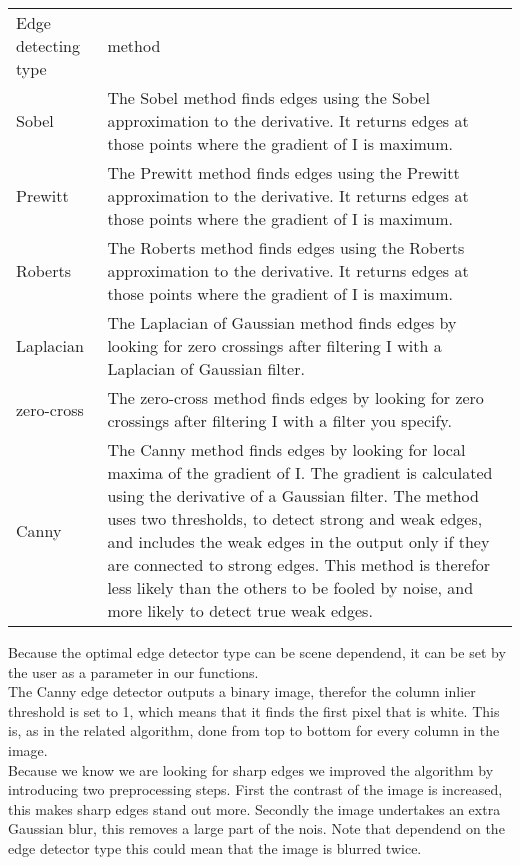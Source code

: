 \documentclass[10pt]{article}
\begin{document}
\begin{tabular}{|l|l|}
	\hline
	Edge detecting type		& method\\
	Sobel					& The Sobel method finds edges using the Sobel
	approximation to the derivative. It returns edges at those points where the
	gradient of I is maximum.\\
	\hline
	Prewitt					& The Prewitt method finds edges using the Prewitt
	approximation to the derivative. It returns edges at those points where the
	gradient of I is maximum.\\
	\hline
	Roberts					& The Roberts method finds edges using the Roberts
	approximation to the derivative. It returns edges at those points where the
	gradient of I is maximum.\\
	\hline
	Laplacian				& The Laplacian of Gaussian method finds edges by
	looking for zero crossings after filtering I with a Laplacian of Gaussian
	filter.\\
	\hline
	zero-cross				& The zero-cross method finds edges by looking for zero
	crossings after filtering I with a filter you specify.\\
	\hline
	Canny					& The Canny method finds edges by looking for local
	maxima of the gradient of I. The gradient is calculated using the derivative of
	a Gaussian filter. The method uses two thresholds, to detect strong and weak
	edges, and includes the weak edges in the output only if they are connected to
	strong edges. This method is therefor less likely than the others to be fooled
	by noise, and more likely to detect true weak edges.\\
	\hline
\end{tabular}

Because the optimal edge detector type can be scene dependend, it can be set
by the user as a parameter in our functions.\\

The Canny edge detector outputs a binary image, therefor the column inlier
threshold is set to 1, which means that it finds the first pixel that is white. 
This is, as in the related algorithm, done from top to bottom for every column in
the image.\\

Because we know we are looking for sharp edges we improved the algorithm by
introducing two preprocessing steps. First the contrast of the image is
increased, this makes sharp edges stand out more.  Secondly the image undertakes
an extra Gaussian blur, this removes a large part of the nois. Note that
dependend on the edge detector type this could mean that the image is blurred
twice.\\
\end{document}
